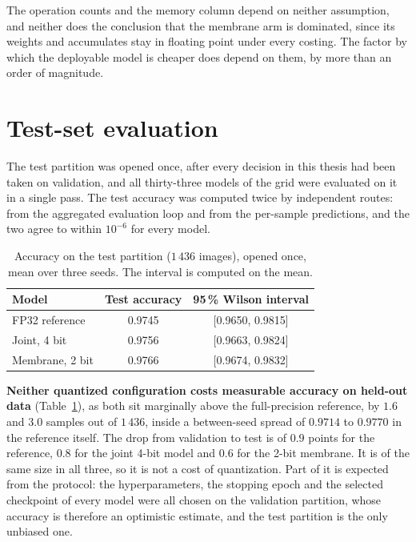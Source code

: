 The operation counts and the memory column depend on neither assumption, and
neither does the conclusion that the membrane arm is dominated, since its
weights and accumulates stay in floating point under every costing. The factor
by which the deployable model is cheaper does depend on them, by more than an
order of magnitude.

\section{Test-set evaluation}
\label{sec:test}

The test partition was opened once, after every decision in this thesis had been
taken on validation, and all thirty-three models of the grid were evaluated on it
in a single pass. The test accuracy was computed twice by independent routes: from the
aggregated evaluation loop and from the per-sample predictions, and the two agree
to within $10^{-6}$ for every model.

\begin{table}[htbp]
\centering
\begin{tabular}{lcc}
\toprule
Model & Test accuracy & 95\,\% Wilson interval \\
\midrule
FP32 reference & 0.9745 & [0.9650, 0.9815] \\
Joint, 4 bit & 0.9756 & [0.9663, 0.9824] \\
Membrane, 2 bit & 0.9766 & [0.9674, 0.9832] \\
\bottomrule
\end{tabular}
\caption{Accuracy on the test partition ($1\,436$ images), opened once, mean over
three seeds. The interval is computed on the mean.}
\label{tab:test}
\end{table}

\textbf{Neither quantized configuration costs measurable accuracy on held-out
data} (Table~\ref{tab:test}), as both sit marginally above the full-precision
reference, by $1.6$ and $3.0$ samples out of $1\,436$, inside a between-seed
spread of $0.9714$ to $0.9770$ in the reference itself. The drop from validation
to test is of $0.9$ points for the reference, $0.8$ for the joint 4-bit model and
$0.6$ for the 2-bit membrane. It is of the same size in all three, so it is not a
cost of quantization. Part of it is expected from the protocol: the
hyperparameters, the stopping epoch and the selected checkpoint of every model
were all chosen on the validation partition, whose accuracy is therefore an
optimistic estimate, and the test partition is the only unbiased one.

